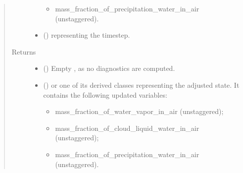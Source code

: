 \documentclass[letterpaper,10pt,english]{sphinxmanual}
\begin{document}
\begin{fulllineitems}
\begin{fulllineitems}
\begin{quote}
\begin{description}
\begin{itemize}
\begin{itemize}
\item {} 
mass\_fraction\_of\_precipitation\_water\_in\_air (unstaggered).

\end{itemize}


\item {} 
 () \textendash{}  representing the timestep.

\end{itemize}

\item[{Returns}] \leavevmode
\begin{itemize}
\item {} 
 () \textendash{} Empty {\hyperref[\detokenize{api:storages.grid_data.GridData}]{}}, as no diagnostics are computed.

\item {} 
 () \textendash{} {\hyperref[\detokenize{api:storages.grid_data.GridData}]{}} or one of its derived classes representing the adjusted state.
It contains the following updated variables:
\begin{itemize}
\item {} 
mass\_fraction\_of\_water\_vapor\_in\_air (unstaggered);

\item {} 
mass\_fraction\_of\_cloud\_liquid\_water\_in\_air (unstaggered);

\item {} 
mass\_fraction\_of\_precipitation\_water\_in\_air (unstaggered).

\end{itemize}

\end{itemize}


\end{description}\end{quote}

\end{fulllineitems}



\end{fulllineitems}
\end{document}
